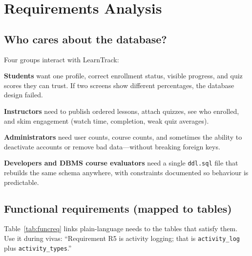 
\chapter{Requirements Analysis}
\label{ch:req}

\section{Who cares about the database?}
Four groups interact with LearnTrack:

\textbf{Students} want one profile, correct enrollment status, visible progress, and quiz scores they can trust. If two screens show different percentages, the database design failed.

\textbf{Instructors} need to publish ordered lessons, attach quizzes, see who enrolled, and skim engagement (watch time, completion, weak quiz averages).

\textbf{Administrators} need user counts, course counts, and sometimes the ability to deactivate accounts or remove bad data---without breaking foreign keys.

\textbf{Developers and DBMS course evaluators} need a single \texttt{ddl.sql} file that rebuilds the same schema anywhere, with constraints documented so behaviour is predictable.

\section{Functional requirements (mapped to tables)}
Table~\ref{tab:funcreq} links plain-language needs to the tables that satisfy them. Use it during vivas: ``Requirement R5 is activity logging; that is \texttt{activity\_log} plus \texttt{activity\_types}.''

